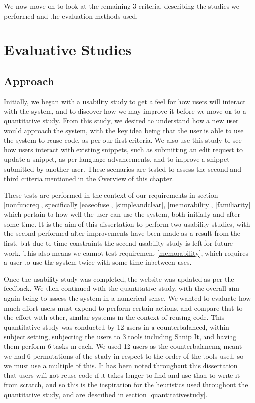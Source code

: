 We now move on to look at the remaining 3 criteria, describing the studies we performed and the evaluation methods used.

\section{Evaluative Studies}
\subsection{Approach} \label{approach}
Initially, we began with a usability study to get a feel for how users will interact with the system, and to discover how we may improve it before we move on to a quantitative study. 
From this study, we desired to understand how a new user would approach the system, with the key idea being that the user is able to use the system to reuse code, as per our first criteria.
We also use this study to see how users interact with existing snippets, such as submitting an edit request to update a snippet, as per language advancements, and to improve a snippet submitted by another user.
These scenarios are tested to assess the second and third criteria mentioned in the Overview of this chapter. 

These tests are performed in the context of our requirements in section \ref{nonfuncreq}, specifically \ref{easeofuse}, \ref{simpleandclear}, \ref{memorability}, \ref{familiarity} which pertain to how well the user can use the system, both initially and after some time.
It is the aim of this dissertation to perform two usability studies, with the second performed after improvements have been made as a result from the first, but due to time constraints the second usability study is left for future work.
This also means we cannot test requirement \ref{memorability}, which requires a user to use the system twice with some time inbetween uses.

Once the usability study was completed, the website was updated as per the feedback. 
We then continued with the quantitative study, with the overall aim again being to assess the system in a numerical sense.
We wanted to evaluate how much effort users must expend to perform certain actions, and compare that to the effort with other, similar systems in the context of reusing code. 
This quantitative study was conducted by 12 users in a counterbalanced, within-subject setting, subjecting the users to 3 tools including Shnip It, and having them perform 6 tasks in each.
We used 12 users as the counterbalancing meant we had 6 permutations of the study in respect to the order of the tools used, so we must use a multiple of this.
It has been noted throughout this dissertation that users will not reuse code if it takes longer to find and use than to write it from scratch, and so this is the inspiration for the heuristics used throughout the quantitative study, and are described in section \ref{quantitativestudy}.


